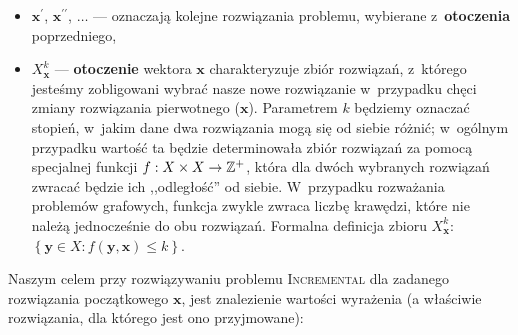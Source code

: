 \begin{itemize}
	\item $\textbf{x}^{\prime}$, $\textbf{x}^{\prime\prime}$, $\dots$ --- oznaczają kolejne rozwiązania problemu, wybierane z~\textbf{otoczenia} poprzedniego,
	\item $X^{k}_{\textbf{x}}$ --- \textbf{otoczenie} wektora $\textbf{x}$ charakteryzuje zbiór rozwiązań, z~którego jesteśmy zobligowani wybrać nasze nowe rozwiązanie w~przypadku chęci zmiany rozwiązania pierwotnego ($\textbf{x}$).
	Parametrem $k$ będziemy oznaczać stopień, w~jakim dane dwa rozwiązania mogą się od siebie różnić; w~ogólnym przypadku wartość ta będzie determinowała zbiór rozwiązań za pomocą specjalnej funkcji $f : X \times X \rightarrow \mathbb{Z}^{+}$, która dla dwóch wybranych rozwiązań zwracać będzie ich ,,odległość'' od siebie.
	W~przypadku rozważania problemów grafowych, funkcja zwykle zwraca liczbę krawędzi, które nie należą jednocześnie do obu rozwiązań. 
	Formalna definicja zbioru $X^{k}_{\textbf{x}}$: $\left\{ \textbf{y} \in X : f \left( \textbf{y}, \textbf{x} \right) \leqslant k \right\}$.
\end{itemize}

Naszym celem przy rozwiązywaniu problemu \textsc{Incremental} dla zadanego rozwiązania początkowego $\textbf{x}$, jest znalezienie wartości wyrażenia (a właściwie rozwiązania, dla którego jest ono przyjmowane):


